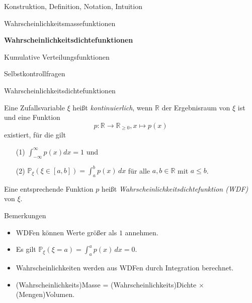 \documentclass[
  8pt,
  ignorenonframetext,
]{beamer}
\begin{document}
\begin{frame}{}
\protect\hypertarget{section-7}{}
\large
{}
\vfill

Konstruktion, Definition, Notation, Intuition

Wahrscheinlichkeitsmassefunktionen

\textbf{Wahrscheinlichkeitsdichtefunktionen}

Kumulative Verteilungsfunktionen

Selbstkontrollfragen \vfill
\end{frame}

\begin{frame}{Wahrscheinlichkeitsdichtefunktionen}
\protect\hypertarget{wahrscheinlichkeitsdichtefunktionen}{}
\small
\begin{definition}
Eine Zufallsvariable $\xi$ heißt \textit{kontinuierlich}, wenn $\mathbb{R}$ der 
Ergebnisraum von $\xi$ ist und eine Funktion 
\begin{equation}
p: \mathbb{R} \to \mathbb{R}_{\ge 0}, x \mapsto p(x)
\end{equation}
existiert, für die gilt
\begin{itemize}
\item[(1)] $\int_{-\infty}^{\infty}p(x)dx = 1$ und
\item[(2)] $\mathbb{P}_\xi(\xi \in [a,b]) = \int_a^b p(x)\,dx$ für alle $a,b\in\mathbb{R}$ mit $a \le b$.
\end{itemize}
Eine entsprechende Funktion $p$ heißt \textit{Wahrscheinlichkeitsdichtefunktion (WDF)} von $\xi$.
\end{definition}

Bemerkungen

\begin{itemize}
\justifying
\item WDFen können Werte größer als $1$ annehmen.
\item Es gilt $\mathbb{P}_\xi(\xi = a) = \int_a^a p(x) \,dx = 0$.
\item Wahrscheinlichkeiten werden aus WDFen durch Integration berechnet.
\item (Wahrscheinlichkeits)Masse = (Wahrscheinlichkeits)Dichte $\times$ (Mengen)Volumen.
\end{itemize}
\end{frame}
\end{document}
